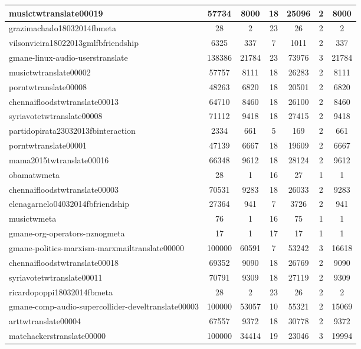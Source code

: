 \begin{table*}[h!]
\begin{center}
\begin{tabular}{| l | c | c | c | c | c | c |}
musictwtranslate00019 & 57734  & 8000  & 18  & 25096  & 2  & 8000 \\\hline
grazimachado18032014fbmeta & 28  & 2  & 23  & 26  & 2  & 2 \\\hline
vilsonvieira18022013gmlfbfriendship & 6325  & 337  & 7  & 1011  & 2  & 337 \\\hline
gmane-linux-audio-userstranslate & 138386  & 21784  & 23  & 73976  & 3  & 21784 \\\hline
musictwtranslate00002 & 57757  & 8111  & 18  & 26283  & 2  & 8111 \\\hline
porntwtranslate00008 & 48263  & 6820  & 18  & 20501  & 2  & 6820 \\\hline
chennaifloodstwtranslate00013 & 64710  & 8460  & 18  & 26100  & 2  & 8460 \\\hline
syriavotetwtranslate00008 & 71112  & 9418  & 18  & 27415  & 2  & 9418 \\\hline
partidopirata23032013fbinteraction & 2334  & 661  & 5  & 169  & 2  & 661 \\\hline
porntwtranslate00001 & 47139  & 6667  & 18  & 19609  & 2  & 6667 \\\hline
mama2015twtranslate00016 & 66348  & 9612  & 18  & 28124  & 2  & 9612 \\\hline
obamatwmeta & 28  & 1  & 16  & 27  & 1  & 1 \\\hline
chennaifloodstwtranslate00003 & 70531  & 9283  & 18  & 26033  & 2  & 9283 \\\hline
elenagarnelo04032014fbfriendship & 27364  & 941  & 7  & 3726  & 2  & 941 \\\hline
musictwmeta & 76  & 1  & 16  & 75  & 1  & 1 \\\hline
gmane-org-operators-nznogmeta & 17  & 1  & 17  & 17  & 1  & 1 \\\hline
gmane-politics-marxism-marxmailtranslate00000 & 100000  & 60591  & 7  & 53242  & 3  & 16618 \\\hline
chennaifloodstwtranslate00018 & 69352  & 9090  & 18  & 26769  & 2  & 9090 \\\hline
syriavotetwtranslate00011 & 70791  & 9309  & 18  & 27119  & 2  & 9309 \\\hline
ricardopoppi18032014fbmeta & 28  & 2  & 23  & 26  & 2  & 2 \\\hline
gmane-comp-audio-supercollider-develtranslate00003 & 100000  & 53057  & 10  & 55321  & 2  & 15069 \\\hline
arttwtranslate00004 & 67557  & 9372  & 18  & 30778  & 2  & 9372 \\\hline
matehackerstranslate00000 & 100000  & 34414  & 19  & 23046  & 3  & 19994 \\\hline

\end{tabular}
\end{center}
\end{table*}
